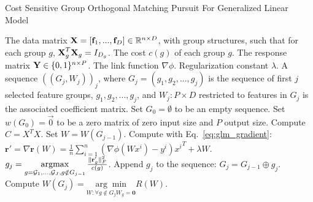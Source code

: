 \begin{algorithm}[ht!]
\caption{Cost Sensitive Group Orthogonal Matching Pursuit For Generalized Linear Model}
 \label{algo:gomp_glm}
\begin{algorithmic}[1]
	 The data matrix $\textbf{X} = [ \textbf{f}_1, ..., \textbf{f}_D ] \in \mathbb{R}^{n \times D}$,
    with group structures, such that for each group $g$,
    $\textbf{X}^T_{g}\textbf{X}_{g} = I _{D_g}$.     
    The cost $c(g)$ of each group $g$. 
    The response matrix $\textbf{Y} \in \{0, 1\}^{n \times P}$.
    The link function $\nabla \phi$.
    Regularization constant $\lambda$.
	 A sequence $((G_j, W_j))_j$, where 
      $G_j = (g_1, g_2, ..., g_j)$ 
    is the sequence of first $j$ selected feature groups, $g_1, g_2, ..., g_j$, and 
      $W_j: P\times D$ restricted to features in $G_j$ 
      is the associated coefficient matrix.
    \STATE Set $G_0 = \emptyset$ to be an empty sequence.
    \STATE Set $w(G_0) = \vec{0}$ to be a zero matrix of zero input size and $P$ output size.
    \STATE Compute $C = X^TX$. 
 	\STATE Set $W = W(G_{j-1})$.
       \STATE Compute with Eq.~\ref{eq:glm_gradient}: 
       	$\textbf{r}' = \nabla \textbf{r}(W) = \frac{1}{n} \sum _{i=1}^n (\nabla \phi(Wx^i) - y^i){x^i}^T + \lambda W$.
    \ENDFOR
    \STATE $g_{j} = \operatorname*{argmax} \limits_{g = \mathcal{G}_1, ... , \mathcal{G}_J, g\notin G_{j-1}} 
    \frac{\Vert \textbf{r}'_g \Vert_F^2}{ c(g) }$.
   \STATE Append $g_j$ to the sequence: $G_{j} = G_{j-1} \oplus g_{j}$.
   \STATE Compute $W(G_j) = \underset{W : \forall g \notin G_j W_g = \textbf{0} }{\arg \min} R(W) $.
 \ENDFOR
\end{algorithmic}
\end{algorithm}